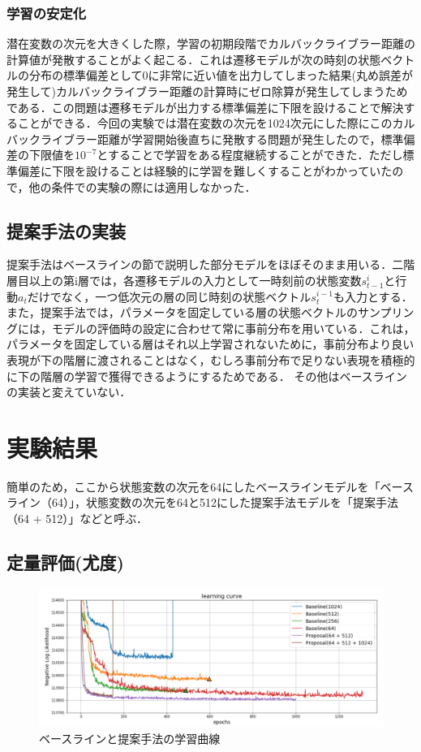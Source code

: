\subsubsection{学習の安定化}
潜在変数の次元を大きくした際，学習の初期段階でカルバックライブラー距離の計算値が発散することがよく起こる．これは遷移モデルが次の時刻の状態ベクトルの分布の標準偏差として0に非常に近い値を出力してしまった結果(丸め誤差が発生して)カルバックライブラー距離の計算時にゼロ除算が発生してしまうためである．この問題は遷移モデルが出力する標準偏差に下限を設けることで解決することができる．今回の実験では潜在変数の次元を1024次元にした際にこのカルバックライブラー距離が学習開始後直ちに発散する問題が発生したので，標準偏差の下限値を$10^{-7}$とすることで学習をある程度継続することができた．ただし標準偏差に下限を設けることは経験的に学習を難しくすることがわかっていたので，他の条件での実験の際には適用しなかった．

\subsection{提案手法の実装}
提案手法はベースラインの節で説明した部分モデルをほぼそのまま用いる．二階層目以上の第i層では，各遷移モデルの入力として一時刻前の状態変数$s^i_{t-1}$と行動$a_t$だけでなく，一つ低次元の層の同じ時刻の状態ベクトル$s^{i-1}_t$も入力とする．また，提案手法では，パラメータを固定している層の状態ベクトルのサンプリングには，モデルの評価時の設定に合わせて常に事前分布を用いている．これは，パラメータを固定している層はそれ以上学習されないために，事前分布より良い表現が下の階層に渡されることはなく，むしろ事前分布で足りない表現を積極的に下の階層の学習で獲得できるようにするためである．
その他はベースラインの実装と変えていない．


\section{実験結果}

簡単のため，ここから状態変数の次元を64にしたベースラインモデルを「ベースライン（64）」，状態変数の次元を64と512にした提案手法モデルを「提案手法（64 + 512）」などと呼ぶ．

\subsection{定量評価(尤度)}

\begin{figure}[tp]
    \begin{center}
        \includegraphics[width=\linewidth]{./figures/curve.png}
        \caption[提案手法の学習曲線]{ベースラインと提案手法の学習曲線}
        \label{fig:curve}
    \end{center}
    \end{figure}

